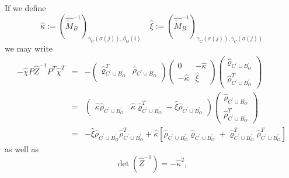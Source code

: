 \documentclass[a4paper]{article}
\begin{document}
If we define 
\begin{equation}
\hat{\kappa}:=
\left(\hat{\check{M}}_{B}^{-1}\right)_{\gamma_{C}(\sigma(j)), \beta_{O}(i)}
\quad
\hat{{\xi}}:=
\left(
  \hat{\check{M}}_{B}^{-1}
\right)_{\gamma_{C}(\sigma(j)), \gamma_{C}(\sigma(j))}
\end{equation}
we may write
\begin{eqnarray}
-\hat{\chi} P \hat{Z}^{-1}P^{T}\hat{\chi}^{T}
&=&
-\left(
\begin{array}{c|c}
\hat{\varrho}_{C^{\prime} \cup B_{O}^{\prime}}^{T}
&
\hat{\rho}_{C^{\prime} \cup B_{O}^{\prime}} \\
\end{array}
\right)
\left(
\begin{array}{c|c}
0              & -\hat{\kappa}  \\
\hline
-\hat{\kappa} & \hat{\xi}
\end{array}
\right)
\left(
\begin{array}{c}
\hat{\varrho}_{C^{\prime} \cup B_{O}^{\prime}}   \\
\hline
\hat{\rho}_{C^{\prime} \cup B_{O}^{\prime}}^{T} 
\end{array}
\right)
\nonumber \\
&=&
\left(
\begin{array}{c|c}
\hat{\kappa}\hat{\rho}_{C^{\prime} \cup B_{O}^{\prime}}
&
\hat{\kappa}\hat{\varrho}_{C^{\prime} \cup B_{O}^{\prime}}^{T}
 -\hat{\xi}\hat{\rho}_{C^{\prime} \cup B_{O}^{\prime}}
\end{array}
\right)
\left(
\begin{array}{c}
\hat{\varrho}_{C^{\prime} \cup B_{O}^{\prime}}   \\
\hline
\hat{\rho}_{C^{\prime} \cup B_{O}^{\prime}}^{T}  
\end{array}
\right)
\nonumber \\
&=&
-\hat{\xi}
 \hat{\rho}_{C^{\prime} \cup B_{O}^{\prime}}
 \hat{\rho}_{C^{\prime} \cup B_{O}^{\prime}}^{T}
+\hat{\kappa}
 \left[
 \hat{\rho}_{C^{\prime} \cup B_{O}^{\prime}}
 \hat{\varrho}_{C^{\prime} \cup B_{O}^{\prime}}
 +\hat{\varrho}_{C^{\prime} \cup B_{O}^{\prime}}^{T}
 \hat{\rho}_{C^{\prime} \cup B_{O}^{\prime}}^{T}
 \right]
\end{eqnarray}
as well as 
\begin{equation}
\det(\hat{Z}^{-1})=-\hat{\kappa}^{2},
\end{equation}
\end{document}

